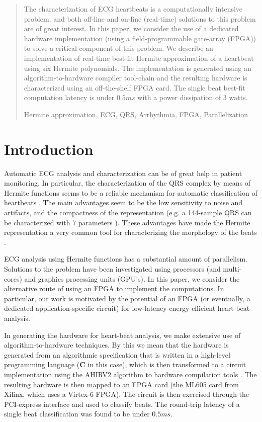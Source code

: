 \documentclass[runningheads]{llncs}
\newcommand{\keywords}[1]{\par\addvspace\baselineskip
\noindent\keywordname\enspace\ignorespaces#1}
\begin{document}
\begin{abstract}
The characterization of ECG heartbeats is a computationally intensive problem, and
both off-line and on-line (real-time) solutions to this problem are of great interest.
In this paper, we consider the use of a dedicated hardware implementation
(using a field-programmable gate-array (FPGA)) to solve a critical component of this problem. 
We describe an implementation of real-time best-fit Hermite approximation of a heartbeat using six Hermite polynomials.  
The implementation is generated using an algorithm-to-hardware compiler tool-chain
and the resulting hardware is characterized using an off-the-shelf FPGA card.
The single beat best-fit computation latency is under $0.5ms$ with a power dissipation of 3 watts.

\keywords{Hermite approximation, ECG, QRS, Arrhythmia,  FPGA, Parallelization}
\end{abstract}


\section{Introduction}

Automatic ECG analysis and characterization can be of great help
in patient monitoring.
In particular, the characterization of the QRS complex by means of Hermite functions 
seems to be a reliable mechanism  for automatic classification of heartbeats \cite{j:lagerholm00}. 
The main advantages seem to be the low sensitivity to noise and artifacts, and the
compactness of the representation (e.g. a 144-sample QRS can be characterized with 7 parameters \cite{c:marquez13}). 
These advantages have made the Hermite representation a very common tool for characterizing the 
morphology of the beats \cite{j:lagerholm00,c:marquez13,c:braccini97,j:linh03a,j:linh03b}. 

ECG analysis using Hermite functions has a
substantial amount of parallelism.  Solutions to the problem have been investigated
using processors (and multi-cores) and graphics processing units (GPU's). 
In this paper, we consider the alternative route of using an FPGA to implement
the computations.  In particular, our work is motivated by the potential
of an FPGA (or eventually, a dedicated application-specific circuit) for low-latency
energy efficient heart-beat analysis.  

In generating the hardware for heart-beat analysis, we make extensive use of
algorithm-to-hardware techniques.  By this we mean that the hardware is
generated from an algorithmic specification that is written in a
high-level programming language ({\bf C} in this case), which is then
transformed to a circuit implementation using the AHIRV2 algorithm to hardware 
compilation tools \cite{c:ahir_thesis2009,c:ahir_dsd2010,c:ahir_usenix2012}.
The resulting hardware is then mapped to an FPGA card (the ML605 card from Xilinx,
which uses a Virtex-6 FPGA).  The circuit is then exercised through the PCI-express 
interface and used to classify beats.  The round-trip latency of a single
beat classification was found to be under $0.5ms$.
\end{document}
